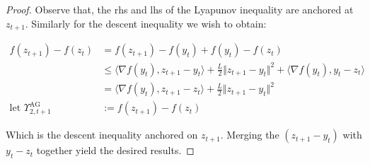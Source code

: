 \documentclass[12pt]{article}
\begin{document}
\begin{proof}
            Observe that, the rhs and lhs of the Lyapunov inequality are anchored at $z_{t + 1}$. 
            Similarly for the descent inequality we wish to obtain: 

            \begin{align*}
                f(z_{t + 1}) - f(z_t) &= f(z_{t + 1}) - f(y_t) + f(y_t) - f(z_t) 
                \\
                &\le 
                \langle \nabla f(y_t), z_{t + 1} - y_t\rangle + \frac{L}{2}\Vert z_{t + 1} - y_t\Vert^2 
                + 
                \langle \nabla f(y_t), y_t - z_t\rangle
                \\
                &= 
                \langle \nabla f(y_t), z_{t + 1} - z_t\rangle + \frac{L}{2}\Vert z_{t + 1} - y_t\Vert^2
                \\
                \text{let }\Upsilon_{2, t + 1}^{\text{AG}} 
                &:= f(z_{t + 1}) - f(z_t)
            \end{align*}

            Which is the descent inequality anchored on $z_{t + 1}$. 
            Merging the $(z_{t + 1} - y_t)$ with $y_t - z_t$ together yield the desired results. 
        \end{proof}
\end{document}
